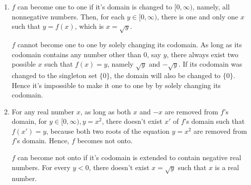 \documentclass{article}
\begin{document}
\begin{enumerate}
\item
$f$ can become one to one if it's domain is changed to $[0, \infty)$, namely, all nonnegative numbers. Then, for each $y \in [0, \infty)$, there is one and only one $x$ such that $y = f(x)$, which is $x = \sqrt{y}$.

$f$ cannot become one to one by solely changing its codomain. As long as its codomain contains any number other than 0, say $y$, there always exist two possible $x$ such that $f(x) = y$, namely $\sqrt{y}$ and $-\sqrt{y}$. If its codomain was changed to the singleton set $\{0\}$, the domain will also be changed to $\{0\}$. Hence it's impossible to make it one to one by by solely changing its codomain.

\item
For any real number $x$, as long as both $x$ and $-x$ are removed from $f$'s domain, for $y \in [0, \infty), y = x^2$, there doesn't exist $x'$ of $f$'s domain such that $f(x') = y$, because both two roots of the equation $y = x^2$ are removed from $f$'s domain. Hence, $f$ becomes not onto.

$f$ can become not onto if it's codomain is extended to contain negative real numbers. For every $y < 0$, there doesn't exist $x = \sqrt{y}$ such that $x$ is a real number.
\end{enumerate}
\end{document}
